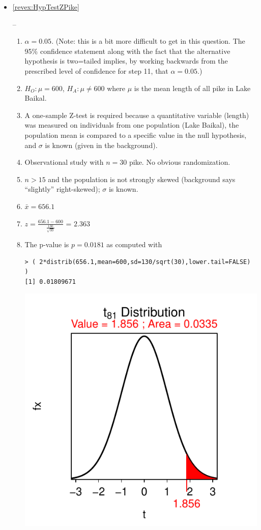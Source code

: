 \documentclass[10pt,openany]{book}\usepackage[]{graphicx}\usepackage[]{color}
\makeatletter
\newenvironment{kframe}{%
 \def\at@end@of@kframe{}%
 \ifinner\ifhmode%
  \def\at@end@of@kframe{\end{minipage}}%
  \begin{minipage}{\columnwidth}%
 \fi\fi%
 \def\FrameCommand##1{\hskip\@totalleftmargin \hskip-\fboxsep
 \colorbox{shadecolor}{##1}\hskip-\fboxsep
     \hskip-\linewidth \hskip-\@totalleftmargin \hskip\columnwidth}%
 \MakeFramed {\advance\hsize-\width
   \@totalleftmargin\z@ \linewidth\hsize
   \@setminipage}}%
 {\par\unskip\endMakeFramed%
 \at@end@of@kframe}
\newenvironment{knitrout}{}{} %
\makeatother
\begin{document}
\begin{itemize}
  \item \hypertarget{ans:HypTestZPike}{\ref{revex:HypTestZPike}} --
    \begin{enumerate}
      \item $\alpha=0.05$. (Note: this is a bit more difficult to get in this question.  The 95\% confidence statement along with the fact that the alternative hypothesis is two=tailed implies, by working backwards from the prescribed level of confidence for step 11, that $\alpha=0.05$.)
      \item $H_{O}:\mu=600$, $H_{A}:\mu\neq600$ where $\mu$ is the mean length of all pike in Lake Baikal.
      \item A one-sample Z-test is required because a quantitative variable (length) was measured on individuals from one population (Lake Baikal), the population mean is compared to a specific value in the null hypothesis, and $\sigma$ is known (given in the background).
      \item Observational study with $n=30$ pike.  No obvious randomization.
      \item $n>15$ and the population is not strongly skewed (background says ``slightly'' right-skewed); $\sigma$ is known.
      \item $\bar{x}=656.1$
      \item $z=\frac{656.1-600}{\frac{130}{\sqrt{30}}}$ = $2.363$
      \item The p-value is $p=0.0181$ as computed with
\begin{knitrout}
\color{fgcolor}\begin{kframe}
\begin{verbatim}
> ( 2*distrib(656.1,mean=600,sd=130/sqrt(30),lower.tail=FALSE) )
[1] 0.01809671
\end{verbatim}
\end{kframe}

{\centering \includegraphics[width=.4\linewidth]{Figs/unnamed-chunk-356-1} 

}
\end{knitrout}
\end{enumerate}
\end{itemize}
\end{document}
